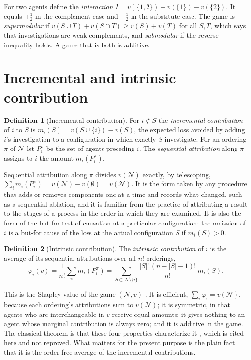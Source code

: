 \documentclass[11pt]{article}
\newcommand{\N}{\mathcal N}
\theoremstyle{plain}
\theoremstyle{definition}
\newtheorem{definition}{Definition}
\begin{document}
For two agents define the \emph{interaction} $I=v(\{1,2\})-v(\{1\})-v(\{2\})$. It equals $+\tfrac12$ in the complement case and $-\tfrac12$ in the substitute case. The game is \emph{supermodular} if $v(S\cup T)+v(S\cap T)\ge v(S)+v(T)$ for all $S,T$, which says that investigations are weak complements, and \emph{submodular} if the reverse inequality holds. A game that is both is additive.

\section{Incremental and intrinsic contribution}\label{sec:incr}

\begin{definition}[Incremental contribution]\label{def:incr}
For $i\notin S$ the \emph{incremental contribution} of $i$ to $S$ is $m_i(S)=v(S\cup\{i\})-v(S)$, the expected loss avoided by adding $i$'s investigation to a configuration in which exactly $S$ investigate. For an ordering $\pi$ of $\N$ let $P^\pi_i$ be the set of agents preceding $i$. The \emph{sequential attribution} along $\pi$ assigns to $i$ the amount $m_i(P^\pi_i)$.
\end{definition}

Sequential attribution along $\pi$ divides $v(\N)$ exactly, by telescoping, $\sum_i m_i(P^\pi_i)=v(\N)-v(\emptyset)=v(\N)$. It is the form taken by any procedure that adds or removes components one at a time and records what changed, such as a sequential ablation, and it is familiar from the practice of attributing a result to the stages of a process in the order in which they are examined. It is also the form of the but-for test of causation at a particular configuration: the omission of $i$ is a but-for cause of the loss at the actual configuration $S$ if $m_i(S)>0$.

\begin{definition}[Intrinsic contribution]\label{def:intrinsic}
The \emph{intrinsic contribution} of $i$ is the average of its sequential attributions over all $n!$ orderings,
\[
\varphi_i(v)=\frac1{n!}\sum_\pi m_i(P^\pi_i)=\sum_{S\subset\N\setminus\{i\}}\frac{|S|!\,(n-|S|-1)!}{n!}\,m_i(S).
\]
\end{definition}

This is the Shapley value of the game $(\N,v)$ \cite{shapley1953value}. It is efficient, $\sum_i\varphi_i=v(\N)$, because each ordering's attributions sum to $v(\N)$; it is symmetric, in that agents who are interchangeable in $v$ receive equal amounts; it gives nothing to an agent whose marginal contribution is always zero; and it is additive in the game. The classical theorem is that these four properties characterize it \cite{shapley1953value}, which is cited here and not reproved. What matters for the present purpose is the plain fact that it is the order-free average of the incremental contributions.
\end{document}
